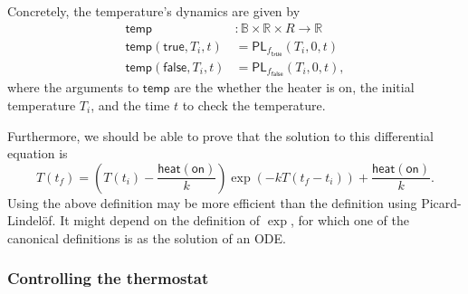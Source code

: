 \documentclass{article}           %
\newcommand{\R}{\mathbb{R}}
\newcommand{\bool}{\mathbb{B}}
\begin{document}
Concretely, the temperature's dynamics are given by
\begin{align*}
\mathsf{temp} &: \bool \times \R \times R \to \R
\\ \mathsf{temp}(\mathsf{true}, T_i, t) &= \mathsf{PL}_{f_\mathsf{true}}(T_i, 0, t)
\\ \mathsf{temp}(\mathsf{false}, T_i, t) &= \mathsf{PL}_{f_\mathsf{false}}(T_i, 0, t),
\end{align*}
where the arguments to $\mathsf{temp}$ are the whether the heater is on, the initial temperature $T_i$, and the time $t$ to check the temperature.

Furthermore, we should be able to prove that the solution to this differential equation is
\[
T(t_f) = \left( T(t_i) - \frac{\mathsf{heat}(\mathsf{on})}{k}\right) \exp\left(-kT(t_f - t_i) \right) + \frac{\mathsf{heat}(\mathsf{on})}{k}.
\]
Using the above definition may be more efficient than the definition using Picard-Lindelöf. It might depend on the definition of $\exp$, for which one of the canonical definitions is as the solution of an ODE.

\subsubsection{Controlling the thermostat}
\end{document}
